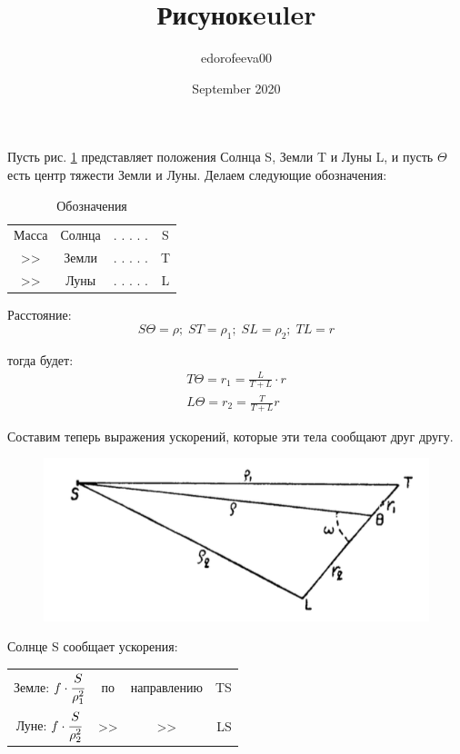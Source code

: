 \documentclass[a4paper,12pt]{article}
\title{Рисунок}
\title{euler}
\author{edorofeeva00 }
\date{September 2020}
\begin{document}
Пусть рис. \ref{21} представляет положения Солнца S, Земли T и Луны L, и пусть $\Theta$ есть центр тяжести Земли и Луны. Делаем следующие обозначения:

\begin{table}[bhtp]
    \centering
    \begin{tabular}{c c c c}
        Масса & Солнца & . . . . . & S \\
        >> & Земли & . . . . . & T \\
        >> & Луны & . . . . . & L \\
    \end{tabular}
    \caption{Обозначения}
    \label{tab:my_label}
\end{table}

Расстояние:
\[ S\Theta = \rho; \; ST = \rho_1; \; SL = \rho_2; \; TL = r \] 

\noindent тогда будет:
\begin{equation} 
    \begin{split}
        T\Theta = r_1 = \frac{L}{T + L} \cdot r \\
        L\Theta = r_2 = \frac{T}{T + L} r 
    \end{split}
    \label{eq:1}
\end{equation}

Составим теперь выражения ускорений, которые эти тела сообщают друг другу.

\begin{figure}[bhtp]
\centering
\includegraphics{21.png}
\caption{}\label{21}
\end{figure}

Солнце S сообщает ускорения: 

\begin{table}[bhtp]
    \centering
    \begin{tabular}{c c c r}
        Земле:  $f \cdot \cfrac{S}{\rho_1^2}$ & по & направлению & TS \\[4mm]
        Луне:  $f \cdot \cfrac{S}{\rho_2^2}$ & >> & >> & LS
    \end{tabular}
\end{table} 
\end{document}

